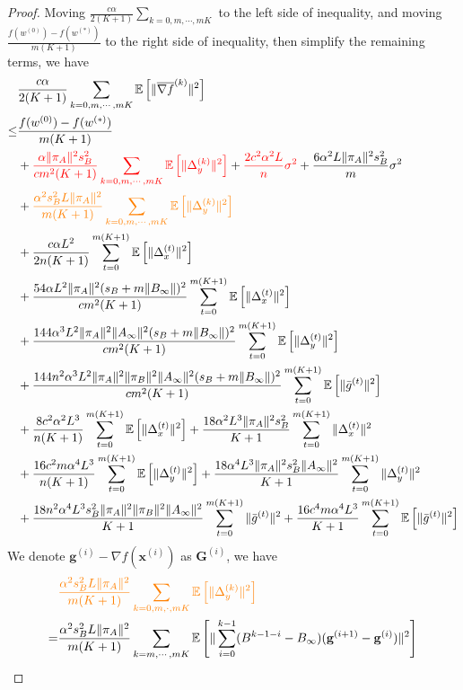 \documentclass{article}
\newcommand{\vg}{{\mathbf{g}}}
\newcommand{\vx}{{\mathbf{x}}}
\newcommand{\EE}[1]{\mathbb{E}\left[#1\right]}
\newcommand{\norm}[1]{\| #1 \|}
\begin{document}
\begin{proof}
  Moving $\frac{c\alpha}{2(K+1)}\sum_{k=0,m,\cdots,mK}$ to the left side of inequality, and moving $\frac{f(w^{(0)})-f(w^{(*)})}{m(K+1)}$ to the right side of inequality, then simplify the remaining terms, we have
  \begin{align*}
    &\frac{c\alpha }{2(K+1)}\sum_{k=0,m,\cdots,mK}\EE{\norm{\overline{\nabla f}^{(k)}}^2}
  \\\leq& \frac{f(w^{(0)})-f(w^{(*)})}{m(K+1)}
    \\&+\textcolor{red}{\frac{\alpha\norm{\pi_A}^2s_B^2}{cm^2(K+1)}\sum_{k=0,m,\cdots,mK}\EE{\norm{\Delta_y^{(k)}}^2}}+\textcolor{red}{ \frac{2c^2\alpha^2L}{n}\sigma^2}+\frac{6\alpha^2L\norm{\pi_A}^2s_B^2}{m}\sigma^2\\&+\textcolor{orange}{\frac{\alpha^2s_B^2L\norm{\pi_A}^2}{m(K+1)}\sum_{k=0,m,\cdots,mK}\EE{\norm{\Delta_y^{(k)}}^2}}\\&+\frac{c\alpha L^2}{2n(K+1)}\sum_{t=0}^{m(K+1)}\EE{\norm{\Delta_x^{(t)}}^2}\\&+\frac{54\alpha L^2\norm{\pi_A}^2(s_B+m\norm{B_{\infty}})^2}{cm^2(K+1)}\sum_{t=0}^{m(K+1)}\EE{\norm{\Delta_x^{(t)}}^2}\\&+\frac{144\alpha^3L^2\norm{\pi_A}^2\norm{A_{\infty}}^2(s_B+m\norm{B_{\infty}})^2}{cm^2(K+1)}\sum_{t=0}^{m(K+1)}\EE{\norm{\Delta_y^{(t)}}^2}
    \\&+\frac{144n^2\alpha^3L^2\norm{\pi_A}^2\norm{\pi_B}^2\norm{A_{\infty}}^2(s_B+m\norm{B_{\infty}})^2}{cm^2(K+1)}\sum_{t=0}^{m(K+1)}\EE{\norm{\bar{g}^{(t)}}^2}\\&+\frac{8c^2\alpha^2L^3}{n(K+1)}\sum_{t=0}^{m(K+1)}\EE{\norm{\Delta_x^{(t)}}^2}+\frac{18\alpha^2L^3\norm{\pi_A}^2s_B^2}{ K+1}\sum_{t=0}^{m(K+1)}\norm{\Delta_x^{(t)}}^2\\&+\frac{16c^2m\alpha^4L^3}{n(K+1)}\sum_{t=0}^{m(K+1)}\EE{\norm{\Delta_y^{(t)}}^2}+\frac{18\alpha^4L^3\norm{\pi_A}^2s_B^2\norm{A_{\infty}}^2}{ K+1}\sum_{t=0}^{m(K+1)}\norm{\Delta_y^{(t)}}^2
    \\&+\frac{18n^2\alpha^4L^3s_B^2\norm{\pi_A}^2\norm{\pi_B}^2\norm{A_{\infty}}^2}{ K+1}\sum_{t=0}^{m(K+1)}\norm{\bar{g}^{(t)}}^2+\frac{16c^4m\alpha^4L^3}{K+1}\sum_{t=0}^{m(K+1)}\EE{\norm{\bar{g}^{(t)}}^2}
  \end{align*}
  We denote $\vg^{(i)}-\nabla f(\vx^{(i)})$ as $\mathbf{G}^{(i)}$, we have
  \begin{align*}
    &\textcolor{orange}{\frac{\alpha^2s_B^2L\norm{\pi_A}^2}{m(K+1)}\sum_{k=0,m,\cdot,mK}\EE{\norm{\Delta_y^{(k)}}^2}}
    \\=&\frac{\alpha^2s_B^2L\norm{\pi_A}^2}{m(K+1)}\sum_{k=m,\cdots,mK}\EE{\norm{\sum_{i=0}^{k-1}(B^{k-1-i}-B_{\infty})(\vg^{(i+1)}-\vg^{(i)})}^2}\\

\end{align*}
\end{proof}
\end{document}

